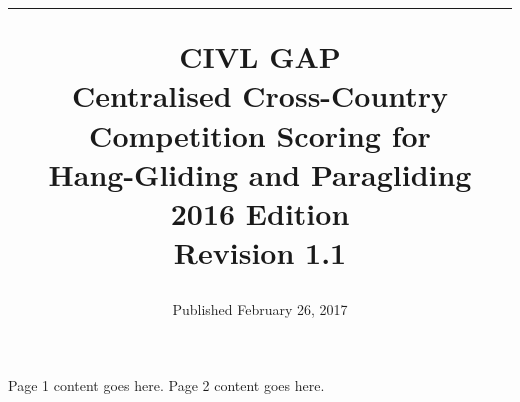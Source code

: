 \documentclass{article}
\title{
    \endgraf\rule{\textwidth}{.4pt}
    CIVL GAP\\
    \vspace*{2\baselineskip}
    Centralised Cross-Country Competition Scoring for\\
    Hang-Gliding and Paragliding\\
    \vspace*{2\baselineskip}
    2016 Edition\\
    Revision 1.1\\
}
\date{Published February 26, 2017}
\begin{document}
{\let\newpage\relax\maketitle}\thispagestyle{pageone}

\newpage
Page 1 content goes here.
\newpage
Page 2 content goes here.
\end{document}
